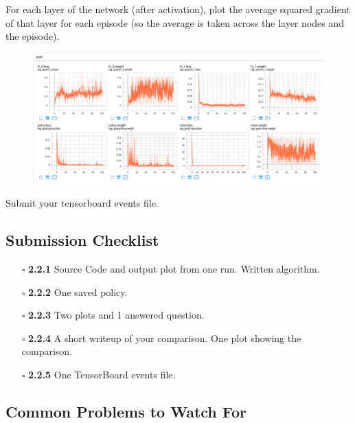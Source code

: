 \documentclass{article}
\begin{document}
\begin{enumerate}
    
    For each layer of the network (after activation), plot the average squared gradient of that layer for each episode (so the average is taken across the layer nodes and the episode).
    
    \begin{figure}[H]
    \begin{center}
    \centerline{\includegraphics[height=\imgheight]{img/tb_gradients.png}}
    \end{center}
    \end{figure}
    
\end{enumerate}



Submit your tensorboard events file.


\subsection{Submission Checklist}

\begin{itemize}
    \item[$\square$] \textbf{2.2.1} Source Code and output plot from one run. Written algorithm.
    \item[$\square$] \textbf{2.2.2} One saved policy.
    \item[$\square$] \textbf{2.2.3} Two plots and 1 answered question.
    \item[$\square$] \textbf{2.2.4} A short writeup of your comparison. One plot showing the comparison.
    \item[$\square$] \textbf{2.2.5} One TensorBoard events file.
\end{itemize}

\subsection{Common Problems to Watch For}
\end{document}
